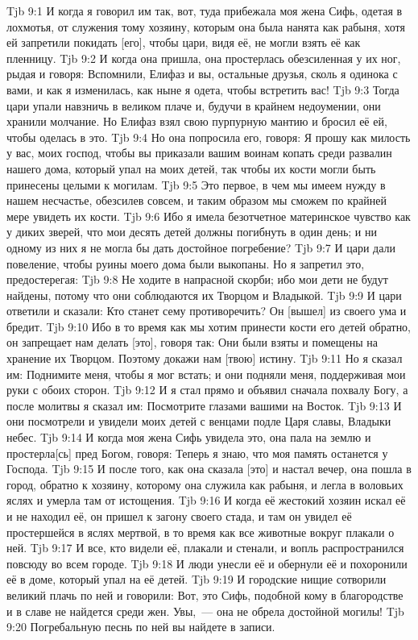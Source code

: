 \vs Tjb 9:1
И когда я говорил им так, вот, туда прибежала моя жена Сифь, одетая в лохмотья, от служения тому хозяину, которым она была нанята как рабыня, хотя ей запретили покидать [его], чтобы цари, видя её, не могли взять её как пленницу.
\vs Tjb 9:2
И когда она пришла, она простерлась обезсиленная у их ног, рыдая и говоря: Вспомнили, Елифаз и вы, остальные друзья, сколь я одинока с вами, и как я изменилась, как ныне я одета, чтобы встретить вас!
\vs Tjb 9:3
Тогда цари упали навзничь в великом плаче и, будучи в крайнем недоумении, они хранили молчание. Но Елифаз взял свою пурпурную мантию и бросил её ей, чтобы оделась в это.
\vs Tjb 9:4
Но она попросила его, говоря: Я прошу как милость у вас, моих господ, чтобы вы приказали вашим воинам копать среди развалин нашего дома, который упал на моих детей, так чтобы их кости могли быть принесены целыми к могилам.
\vs Tjb 9:5
Это первое, в чем мы имеем нужду в нашем несчастье, обезсилев совсем, и таким образом мы сможем по крайней мере увидеть их кости.
\vs Tjb 9:6
Ибо я имела безотчетное материнское чувство как у диких зверей, что мои десять детей должны погибнуть в один день; и ни одному из них я не могла бы дать достойное погребение?
\vs Tjb 9:7
И цари дали повеление, чтобы руины моего дома были выкопаны. Но я запретил это, предостерегая:
\vs Tjb 9:8
Не ходите в напрасной скорби; ибо мои дети не будут найдены, потому что они соблюдаются их Творцом и Владыкой.
\vs Tjb 9:9
И цари ответили и сказали: Кто станет сему противоречить? Он [вышел] из своего ума и бредит.
\vs Tjb 9:10
Ибо в то время как мы хотим принести кости его детей обратно, он запрещает нам делать [это], говоря так: Они были взяты и помещены на хранение их Творцом. Поэтому докажи нам [твою] истину.
\vs Tjb 9:11
Но я сказал им: Поднимите меня, чтобы я мог встать; и они подняли меня, поддерживая мои руки с обоих сторон.
\vs Tjb 9:12
И я стал прямо и объявил сначала похвалу Богу, а после молитвы я сказал им: Посмотрите глазами вашими на Восток.
\vs Tjb 9:13
И они посмотрели и увидели моих детей с венцами подле Царя славы, Владыки небес.
\vs Tjb 9:14
И когда моя жена Сифь увидела это, она пала на землю и простерла[сь] пред Богом, говоря: Теперь я знаю, что моя память останется у Господа.
\vs Tjb 9:15
И после того, как она сказала [это] и настал вечер, она пошла в город, обратно к хозяину, которому она служила как рабыня, и легла в воловьих яслях и умерла там от истощения.
\vs Tjb 9:16
И когда её жестокий хозяин искал её и не находил её, он пришел к загону своего стада, и там он увидел её простершейся в яслях мертвой, в то время как все животные вокруг плакали о ней.
\vs Tjb 9:17
И все, кто видели её, плакали и стенали, и вопль распространился повсюду во всем городе.
\vs Tjb 9:18
И люди унесли её и обернули её и похоронили её в доме, который упал на её детей.
\vs Tjb 9:19
И городские нищие сотворили великий плачь по ней и говорили: Вот, это Сифь, подобной кому в благородстве и в славе не найдется среди жен. Увы,~--- она не обрела достойной могилы!
\vs Tjb 9:20
Погребальную песнь по ней вы найдете в записи.

